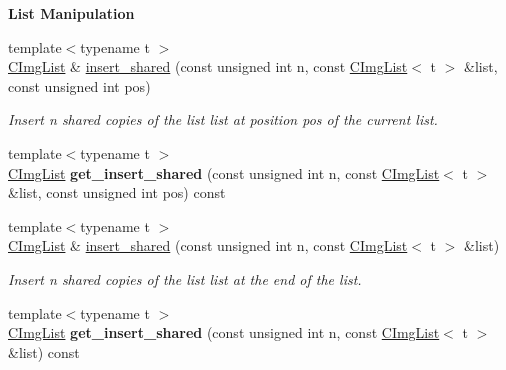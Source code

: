 \begin{Indent}{\bf List Manipulation}
\begin{DoxyCompactItemize}
\item 
\hypertarget{structcimg__library_1_1_c_img_list_a9d2185ce7cb06b8a7bbb60ef9005e578}{
{\footnotesize template$<$typename t $>$ }\\\hyperlink{structcimg__library_1_1_c_img_list}{CImgList} \& \hyperlink{structcimg__library_1_1_c_img_list_a9d2185ce7cb06b8a7bbb60ef9005e578}{insert\_\-shared} (const unsigned int n, const \hyperlink{structcimg__library_1_1_c_img_list}{CImgList}$<$ t $>$ \&list, const unsigned int pos)}
\label{structcimg__library_1_1_c_img_list_a9d2185ce7cb06b8a7bbb60ef9005e578}

\begin{DoxyCompactList}\small\item\em Insert n shared copies of the list {\ttfamily list} at position {\ttfamily pos} of the current list. \item\end{DoxyCompactList}\item 
\hypertarget{structcimg__library_1_1_c_img_list_a0a84354c14a7e5f32d439aa25abcdcb4}{
{\footnotesize template$<$typename t $>$ }\\\hyperlink{structcimg__library_1_1_c_img_list}{CImgList} {\bfseries get\_\-insert\_\-shared} (const unsigned int n, const \hyperlink{structcimg__library_1_1_c_img_list}{CImgList}$<$ t $>$ \&list, const unsigned int pos) const }
\label{structcimg__library_1_1_c_img_list_a0a84354c14a7e5f32d439aa25abcdcb4}

\item 
\hypertarget{structcimg__library_1_1_c_img_list_a5567001bc3e0317c6595a1a12381f33f}{
{\footnotesize template$<$typename t $>$ }\\\hyperlink{structcimg__library_1_1_c_img_list}{CImgList} \& \hyperlink{structcimg__library_1_1_c_img_list_a5567001bc3e0317c6595a1a12381f33f}{insert\_\-shared} (const unsigned int n, const \hyperlink{structcimg__library_1_1_c_img_list}{CImgList}$<$ t $>$ \&list)}
\label{structcimg__library_1_1_c_img_list_a5567001bc3e0317c6595a1a12381f33f}

\begin{DoxyCompactList}\small\item\em Insert n shared copies of the list {\ttfamily list} at the end of the list. \item\end{DoxyCompactList}\item 
\hypertarget{structcimg__library_1_1_c_img_list_a889d3735dea5c3e5ff49623a9ae20f32}{
{\footnotesize template$<$typename t $>$ }\\\hyperlink{structcimg__library_1_1_c_img_list}{CImgList} {\bfseries get\_\-insert\_\-shared} (const unsigned int n, const \hyperlink{structcimg__library_1_1_c_img_list}{CImgList}$<$ t $>$ \&list) const }
\label{structcimg__library_1_1_c_img_list_a889d3735dea5c3e5ff49623a9ae20f32}


\end{DoxyCompactItemize}
\end{Indent}
